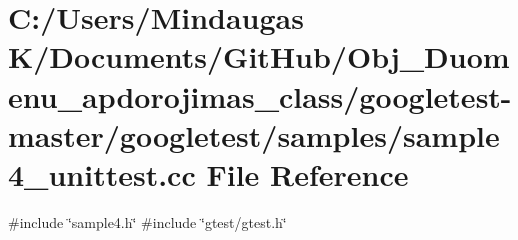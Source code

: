 \hypertarget{googletest-master_2googletest_2samples_2sample4__unittest_8cc}{}\section{C\+:/\+Users/\+Mindaugas K/\+Documents/\+Git\+Hub/\+Obj\+\_\+\+Duomenu\+\_\+apdorojimas\+\_\+class/googletest-\/master/googletest/samples/sample4\+\_\+unittest.cc File Reference}
\label{googletest-master_2googletest_2samples_2sample4__unittest_8cc}
{\ttfamily \#include \char`\"{}sample4.\+h\char`\"{}}\newline
{\ttfamily \#include \char`\"{}gtest/gtest.\+h\char`\"{}}\newline

